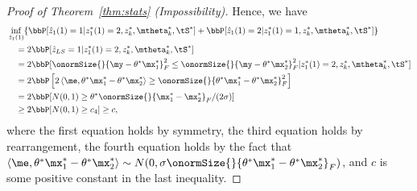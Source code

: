 \documentclass[lettersize,onecolumn,journal]{IEEEtran}
\theoremstyle{definition}
\theoremstyle{definition}
\newcommand{\off}[1]{\left[#1\right]}
\newcommand{\ang}[1]{\left\langle#1\right\rangle}
\begin{document}
{\begin{proof}[Proof of Theorem~\ref{thm:stats} (Impossibility)]
   
   Hence, we have 
   \begin{align}
       & \inf_{\hat z_1(1)} \{ \bbP[\hat z_1(1) = 1| z_1^*(1) = 2, z^*_k,  \mtheta_k^*, \tS^*] +   \bbP[\hat z_1(1) = 2| z_1^*(1) = 1, z^*_k,  \mtheta_k^*, \tS^*] \} \\
       & \quad = 2 \bbP[ \hat z_{LS} = 1 |  z_1^*(1) = 2, z^*_k,  \mtheta_k^*, \tS^* ] \\
      & \quad  = 2 \bbP[ \onormSize{}{\my - \theta^* \mx_1^*}_F^2 \leq \onormSize{}{\my - \theta^* \mx_2^*}_F^2 | z_1^*(1) = 2, z^*_k , \mtheta_k^*, \tS^*   ] \\
      & \quad = 2 \bbP \off{ 2 \ang{\me, \theta^* \mx_1^* - \theta^*\mx_2^* } \geq  \onormSize{}{\theta^* \mx_1^* - \theta^*\mx_2^*}_F^2 }\\
       & \quad =  2 \bbP[ N(0,1) \geq \theta^* \onormSize{}{\mx_1^* - \mx_2^*}_F /(2\sigma) ] \\
       & \quad \geq 2 \bbP[ N(0,1) \geq c_4 ]   \geq c, \label{eq:inf}
   \end{align}
where the first equation holds by symmetry, the third equation holds by rearrangement, the fourth equation holds by the fact that $\ang{\me, \theta^* \mx_1^* - \theta^*\mx_2^* } \sim N(0, \sigma \onormSize{}{\theta^* \mx_1^* - \theta^*\mx_2^*}_F)$, and $c$ is some positive constant in the last inequality.
   

\end{proof}}
\end{document}
